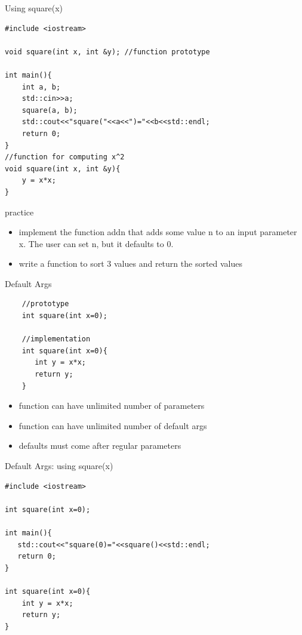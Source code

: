 \documentclass[xcolor={dvipsnames}]{beamer}
\begin{document}
\begin{frame}[fragile]{Using square(x)}

\begin{verbatim}
#include <iostream>

void square(int x, int &y); //function prototype

int main(){
    int a, b;
    std::cin>>a;
    square(a, b);
    std::cout<<"square("<<a<<")="<<b<<std::endl;
    return 0;
}
//function for computing x^2
void square(int x, int &y){
    y = x*x;
}   
\end{verbatim}

\end{frame}

\begin{frame}{practice}
	\begin{itemize}
		\item implement the function addn that adds some value n to an input parameter x. The user can set n, but it defaults to 0.
		\item write a function to sort 3 values and return the sorted values
	\end{itemize}
\end{frame}

\begin{frame}[fragile]{Default Args}
	\begin{center}
	\begin{verbatim}
	//prototype
	int square(int x=0);

	//implementation
	int square(int x=0){
	   int y = x*x;
	   return y;
	}   
	\end{verbatim}
	\end{center}
	\begin{center}
	\begin{itemize}
		\item function can have unlimited number of parameters
		\item function can have unlimited number of default args
		\item defaults must come after regular parameters
	\end{itemize}
	\end{center}
\end{frame}

\begin{frame}[fragile]{Default Args: using square(x)}

\begin{verbatim}
#include <iostream>

int square(int x=0);

int main(){
   std::cout<<"square(0)="<<square()<<std::endl;
   return 0;
}

int square(int x=0){
    int y = x*x;
    return y;
}   
\end{verbatim}

\end{frame}
\end{document}
